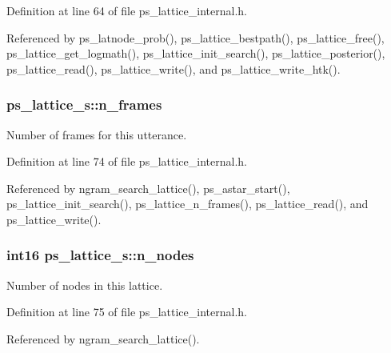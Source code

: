 Definition at line 64 of file ps\+\_\+lattice\+\_\+internal.\+h.



Referenced by ps\+\_\+latnode\+\_\+prob(), ps\+\_\+lattice\+\_\+bestpath(), ps\+\_\+lattice\+\_\+free(), ps\+\_\+lattice\+\_\+get\+\_\+logmath(), ps\+\_\+lattice\+\_\+init\+\_\+search(), ps\+\_\+lattice\+\_\+posterior(), ps\+\_\+lattice\+\_\+read(), ps\+\_\+lattice\+\_\+write(), and ps\+\_\+lattice\+\_\+write\+\_\+htk().

\subsubsection[{n\+\_\+frames}]{ ps\+\_\+lattice\+\_\+s\+::n\+\_\+frames}\label{structps__lattice__s_a3a997dc60d28b84d5bfc01f9ce25a891}


Number of frames for this utterance. 



Definition at line 74 of file ps\+\_\+lattice\+\_\+internal.\+h.



Referenced by ngram\+\_\+search\+\_\+lattice(), ps\+\_\+astar\+\_\+start(), ps\+\_\+lattice\+\_\+init\+\_\+search(), ps\+\_\+lattice\+\_\+n\+\_\+frames(), ps\+\_\+lattice\+\_\+read(), and ps\+\_\+lattice\+\_\+write().

\subsubsection[{n\+\_\+nodes}]{\setlength{\rightskip}{0pt plus 5cm}int16 ps\+\_\+lattice\+\_\+s\+::n\+\_\+nodes}\label{structps__lattice__s_ab3690a8d16e3fa8a3b0dd3aa8277b653}


Number of nodes in this lattice. 



Definition at line 75 of file ps\+\_\+lattice\+\_\+internal.\+h.



Referenced by ngram\+\_\+search\+\_\+lattice().

